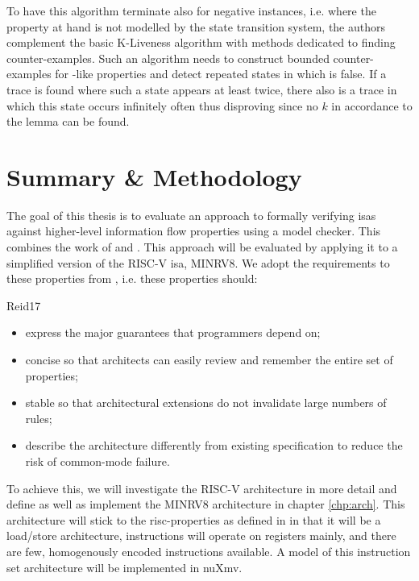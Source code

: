 To have this algorithm terminate also for negative instances, i.e. where the property at hand is not modelled by the state transition system, the authors complement the basic K-Liveness algorithm with methods dedicated to finding counter-examples.
Such an algorithm needs to construct bounded counter-examples for -like properties and detect repeated states in which  is false.
If a trace is found where such a state appears at least twice, there also is a trace in which this state occurs infinitely often thus disproving  since no $ k $ in accordance to the lemma can be found.

\section{Summary \& Methodology}
\label{sec:sum-background}

The goal of this thesis is to evaluate an approach to formally verifying \glspl{isa} against higher-level information flow properties using a model checker.
This combines the work of \citeauthor{Reid17} \cite{Reid17} and \citeauthor{Ferraiuolo17} \cite{Ferraiuolo17}.
This approach will be evaluated by applying it to a simplified version of the RISC-V \gls{isa}, MINRV8.
We adopt the requirements to these properties from \cite{Reid17}, i.e. these properties should:

\begin{displaycquote}[pp.88:2-3]{Reid17}
    \textelp{}
    \begin{itemize}
        \item express the major guarantees that programmers depend on;
        \item {} concise so that architects can easily review and remember the entire set of properties;
        \item {} stable so that architectural extensions do not invalidate large numbers of rules;
        \item \textelp{} describe the architecture differently from existing specification to reduce the risk of common-mode failure.
    \end{itemize}
\end{displaycquote}

To achieve this, we will investigate the RISC-V architecture in more detail and define as well as implement the MINRV8 architecture in chapter \ref{chp:arch}.
This architecture will stick to the \gls{risc}-properties as defined in \cite{Hennessy12} in that it will be a load/store architecture, instructions will operate on registers mainly, and there are few, homogenously encoded instructions available.
A model of this instruction set architecture will be implemented in nuXmv.

